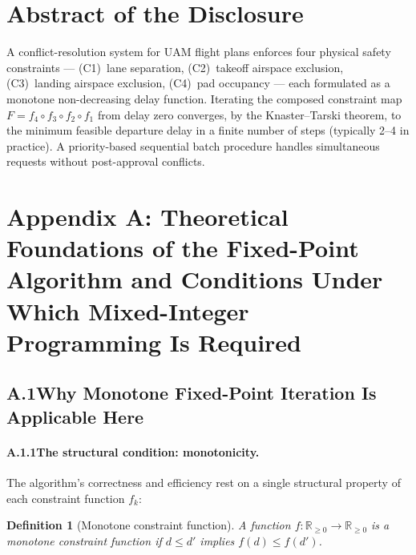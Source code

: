 \documentclass[12pt,a4paper]{article}
\newtheorem{definition}{Definition}
\begin{document}
\section{Abstract of the Disclosure}

A conflict-resolution system for UAM flight plans enforces four physical safety
constraints — (C1)~lane separation, (C2)~takeoff airspace exclusion,
(C3)~landing airspace exclusion, (C4)~pad occupancy — each formulated as a
monotone non-decreasing delay function.  Iterating the composed constraint map
$F = f_4 \circ f_3 \circ f_2 \circ f_1$ from delay zero converges, by the
Knaster--Tarski theorem, to the minimum feasible departure delay in a finite
number of steps (typically 2--4 in practice).  A priority-based sequential
batch procedure handles simultaneous requests without post-approval conflicts.


\newpage
\appendix
\section{Appendix A: Theoretical Foundations of the Fixed-Point Algorithm
         and Conditions Under Which Mixed-Integer Programming Is Required}

\subsection*{A.1\quad Why Monotone Fixed-Point Iteration Is Applicable Here}

\paragraph{A.1.1\quad The structural condition: monotonicity.}
The algorithm's correctness and efficiency rest on a single structural
property of each constraint function $f_k$:

\begin{definition}[Monotone constraint function]
A function $f\colon \mathbb{R}_{\ge 0}\to\mathbb{R}_{\ge 0}$ is a
\emph{monotone constraint function} if $d \le d'$ implies $f(d) \le f(d')$.
\end{definition}
\end{document}
